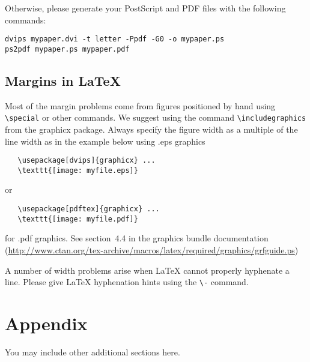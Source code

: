 \documentclass{article} %
\begin{document}
Otherwise, please generate your PostScript and PDF files with the following commands:
\begin{verbatim}
dvips mypaper.dvi -t letter -Ppdf -G0 -o mypaper.ps
ps2pdf mypaper.ps mypaper.pdf
\end{verbatim}

\subsection{Margins in LaTeX}

Most of the margin problems come from figures positioned by hand using
\verb+\special+ or other commands. We suggest using the command
\verb+\includegraphics+
from the graphicx package. Always specify the figure width as a multiple of
the line width as in the example below using .eps graphics
\begin{verbatim}
   \usepackage[dvips]{graphicx} ...
   \texttt{[image: myfile.eps]}
\end{verbatim}
or %
\begin{verbatim}
   \usepackage[pdftex]{graphicx} ...
   \texttt{[image: myfile.pdf]}
\end{verbatim}
for .pdf graphics.
See section~4.4 in the graphics bundle documentation (\url{http://www.ctan.org/tex-archive/macros/latex/required/graphics/grfguide.ps})

A number of width problems arise when LaTeX cannot properly hyphenate a
line. Please give LaTeX hyphenation hints using the \verb+\-+ command.





\appendix
\section{Appendix}
You may include other additional sections here.
\end{document}
